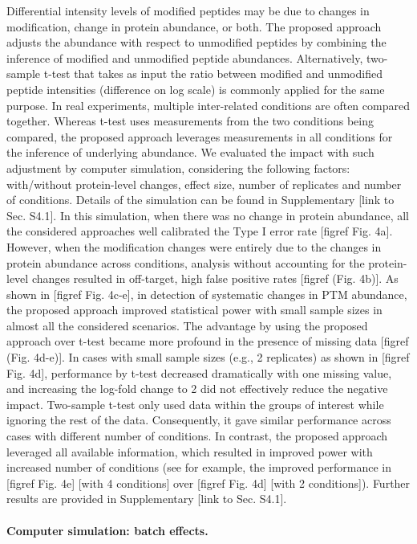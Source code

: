 \documentclass[mcp]{article}
\numberwithin{figure}{section} %
\numberwithin{table}{section}
\def\todo#1{{\color{red}[#1]}}
\begin{document}
Differential intensity levels of modified peptides may be due to changes in modification, change in protein abundance, or both. The proposed approach adjusts the abundance with respect to unmodified peptides by combining the inference of modified and unmodified peptide abundances. Alternatively, two-sample t-test that takes as input the ratio between modified and unmodified peptide intensities (difference on log scale) is commonly applied for the same purpose. In real experiments, multiple inter-related conditions are often compared together. Whereas t-test uses measurements from the two conditions being compared, the proposed approach leverages measurements in all conditions for the inference of underlying abundance. We evaluated the impact with such adjustment by computer simulation, considering the following factors: with/without protein-level changes, effect size, number of replicates and number of conditions. Details of the simulation can be found in Supplementary \todo{link to Sec. S4.1}. 
In this simulation, when there was no change in protein abundance, all the considered approaches well calibrated the Type I error rate \todo{figref Fig. 4a}. However, when the modification changes were entirely due to the changes in protein abundance across conditions, analysis without accounting for the protein-level changes resulted in off-target, high false positive rates \todo{figref (Fig. 4b)}. As shown in \todo{figref Fig. 4c-e}, in detection of systematic changes in PTM abundance, the proposed approach improved statistical power with small sample sizes in almost all the considered scenarios. The advantage by using the proposed approach over t-test became more profound in the presence of missing data \todo{figref (Fig. 4d-e)}. In cases with small sample sizes (e.g., 2 replicates) as shown in \todo{figref Fig. 4d}, performance by t-test decreased dramatically with one missing value, and increasing the log-fold change to 2 did not effectively reduce the negative impact. Two-sample t-test only used data within the groups of interest while ignoring the rest of the data. Consequently, it gave similar performance across cases with different number of conditions. In contrast, the proposed approach leveraged all available information, which resulted in improved power with increased number of conditions (see for example, the improved performance in \todo{figref Fig. 4e} [with 4 conditions] over \todo{figref Fig. 4d} [with 2 conditions]). Further results are provided in Supplementary \todo{link to Sec. S4.1}. 

\paragraph*{Computer simulation: batch effects.} 
\end{document}
